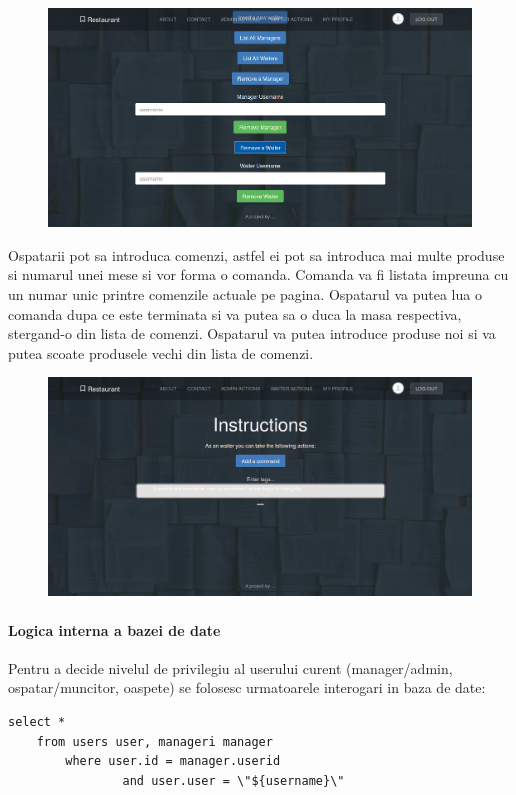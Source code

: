 \documentclass[12pt,english]{article}
\begin{document}
\begin{figure}[H]
\includegraphics[width=1\textwidth]{admin_4.png}
\end{figure}

\begin{flushleft}
[neterminat] Ospatarii pot sa introduca comenzi, astfel ei pot sa introduca mai multe produse si numarul unei mese si vor forma o comanda. Comanda va fi listata impreuna cu un numar unic printre comenzile actuale pe pagina. Ospatarul va putea lua o comanda dupa ce este terminata si va putea sa o duca la masa respectiva, stergand-o din lista de comenzi. Ospatarul va putea introduce produse noi si va putea scoate produsele vechi din lista de comenzi.
\end{flushleft}

\begin{figure}[H]
\includegraphics[width=1\textwidth]{waiter_1.png}
\end{figure}

\paragraph{ Logica interna a bazei de date }

\begin{flushleft}
Pentru a decide nivelul de privilegiu al userului curent (manager/admin, ospatar/muncitor, oaspete) se folosesc urmatoarele interogari in baza de date:

\end{flushleft}
\begin{lstlisting}
select * 
    from users user, manageri manager
        where user.id = manager.userid
                and user.user = \"${username}\"
\end{lstlisting}
\end{document}
